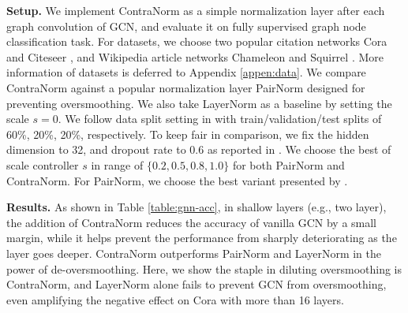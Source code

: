 \documentclass{article}
\theoremstyle{definition}
\theoremstyle{remark}
\theoremstyle{theorem}
\begin{document}
\textbf{Setup.} We implement ContraNorm as a simple normalization layer after each graph convolution of GCN, and evaluate it on fully supervised graph node classification task. For datasets, we choose two popular citation networks Cora \citep{mccallum2000automating} and Citeseer \citep{giles1998citeseer}, and Wikipedia article networks Chameleon and Squirrel \citep{rozemberczki2021multi}. More information of datasets is deferred to Appendix \ref{appen:data}. We compare ContraNorm against a popular normalization layer PairNorm \citep{zhao2019pairnorm} designed for preventing oversmoothing. We also take LayerNorm as a baseline by setting the scale $s=0$.  We follow data split setting in \citet{kipf2016semi} with train/validation/test splits of 60\%, 20\%, 20\%, respectively. To keep fair in comparison, we fix the hidden dimension to 32, and dropout rate to 0.6 as reported in \citet{zhao2019pairnorm}. We choose the best of scale controller $s$ in range of $\{0.2, 0.5, 0.8, 1.0\}$ for both PairNorm and ContraNorm. For PairNorm, we choose the best variant presented by \citet{zhao2019pairnorm}.


\textbf{Results.} As shown in Table \ref{table:gnn-acc}, in shallow layers (e.g., two layer), the addition of ContraNorm reduces the accuracy of vanilla GCN by a small margin, while it helps prevent the performance from sharply deteriorating as the layer goes deeper. ContraNorm outperforms PairNorm and LayerNorm in the power of de-oversmoothing. Here, we show the staple in diluting oversmoothing is ContraNorm, and LayerNorm alone fails to prevent GCN from oversmoothing, even amplifying the negative effect on Cora with more than 16 layers.
\end{document}
